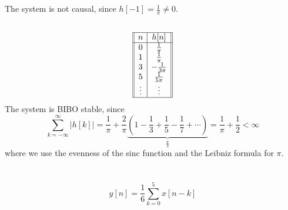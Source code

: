 \documentclass{article}
\begin{document}
\subsection{}

The system is not causal, since \(h[-1] = \frac{1}{\pi} \neq 0\).

\subsection{}

\begin{equation}
    \begin{array}[]{||c|c||}
        \hline
        n & h[n] \\
        \hline
        0 & \frac{1}{\pi} \\
        1 & \frac{1}{\pi} \\
        3 & -\frac{1}{3\pi} \\
        5 & \frac{1}{5\pi} \\
        \vdots & \vdots \\
        \hline
    \end{array}
\end{equation}
The system is BIBO stable, since
\begin{equation}
    \sum_{k = -\infty}^\infty |h[k]| = \frac{1}{\pi} + \frac{2}{\pi} \underbrace{\left(1 - \frac{1}{3} + \frac{1}{5} - \frac{1}{7} + \cdots\right)}_{\frac{\pi}{4}} = \frac{1}{\pi} + \frac{1}{2} < \infty
\end{equation}
where we use the evenness of the sinc function and the Leibniz formula for \(\pi\).


\newpage
\section{}

\begin{equation}
    y[n] = \frac{1}{6} \sum_{k = 0}^5 x[n - k]
\end{equation}

\subsection{}
\end{document}

